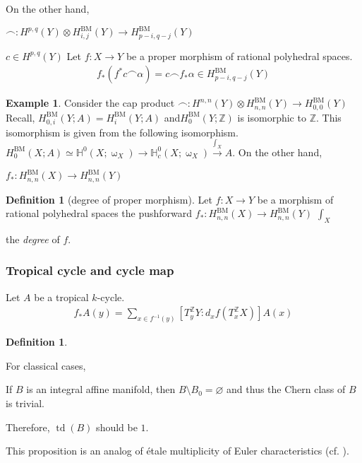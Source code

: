 \documentclass[a4paper,dvipdfmx,reqno,12pt]{amsart}
\makeatletter
\newcommand{\ind}[2]{\emph{#1}\index{1{#2}@{#1}}}
\theoremstyle{definition}
\newtheorem{Def}[Thm]{Definition}
\newtheorem{Eg}[Thm]{Example}
\newcommand{\emp}{\varnothing}%
\newcommand{\Z}{\mathbb{Z}}%
\newcommand{\mb}[1]{\mathbb{#1}}%
\newcommand{\opn}[1]{\operatorname{#1}}
\newcommand{\xto}[1]{\xrightarrow{#1}}
\numberwithin{equation}{section}
\makeatother
\begin{document}
On the other hand,

$\frown: H^{p,q}(Y) \otimes H_{i,j}^{\opn{BM}}(Y)\to H_{p-i,q-j}^{\opn{BM}}(Y)$

$c\in H^{p,q}(Y)$
Let $f:X\to Y$ be a proper morphism of rational polyhedral spaces.
\begin{align}
  f_*(f^{*}c\frown \alpha)=c\frown f_*\alpha\in H_{p-i,q-j}^{\opn{BM}}(Y)
\end{align}
\begin{Eg}
  Consider the cap product
  $\frown:H^{n,n}(Y)\otimes H_{n,n}^{\opn{BM}}(Y)\to H^{\opn{BM}}_{0,0}(Y)$
  Recall, $H^{\opn{BM}}_{0,i}(Y;A)=H_{i}^{\opn{BM}}(Y;A)$ and$H_{0}^{\opn{BM}}(Y;\Z)$
  is isomorphic to $\Z$. This isomorphism is given from the following isomorphism.
  $H_{0}^{\opn{BM}}(X;A)\simeq
    \mb{H}^{0}(X;\upomega_X)\to \mb{H}_c^{0}(X;\upomega_X) \xto{\int_X} A$.
  On the other hand,

  $f_*:H_{n,n}^{\opn{BM}}(X)\to H_{n,n}^{\opn{BM}}(Y)$

\end{Eg}
\begin{Def}[degree of proper morphism]
  Let $f:X\to Y$ be a morphism of rational polyhedral spaces the pushforward
  $f_*:H_{n,n}^{\opn{BM}}(X)\to H_{n,n}^{\opn{BM}}(Y)$ $\int_X$

  the \ind{degree}{degree} of $f$.
\end{Def}


\subsubsection{Tropical cycle and cycle map}

Let $A$ be a tropical $k$-cycle.
\cite[Definition 3.6]{gross2019sheaftheoretic}
\begin{align}
  f_*A(y)=\sum_{x\in f^{-1}(y)}[T^{\Z}_yY:d_xf(T^{\Z}_x X)]A(x)
\end{align}

\begin{Def}

\end{Def}

For classical cases,

If $B$ is an integral affine manifold, then $B\setminus B_0=\emp$ and thus the Chern class of $B$ is trivial.



Therefore, $\opn{td}(B)$ should be $1$.

This proposition is an analog of \'{e}tale multiplicity of Euler characteristics
(cf. \cite[Proposition 1.1.28]{}).
\end{document}
